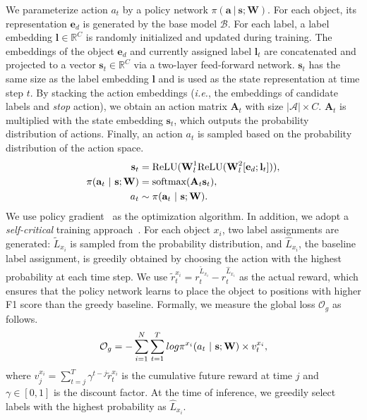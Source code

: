 \documentclass[11pt,a4paper]{article}
\newcommand{\start}[1]{\vspace{1.8mm}\noindent{{\bf #1}}}
\newcommand{\ie}{\textit{i.e.}} \newcommand{\eg}{\textit{e.g.}}
\begin{document}
\start{States and Policy Network.}
We parameterize action $a_t$ by a policy network $\pi(\textbf{a}\ |\ \textbf{s}; \textbf{W})$.
For each object, its representation $\textbf{e}_d$ is generated by the base model $\mathcal{B}$.
For each label, a label embedding $\textbf{l} \in \mathbb{R}^C$ is randomly initialized and updated during training.
The embeddings of the object $\textbf{e}_d$ and currently assigned label $\textbf{l}_t$ are concatenated and projected to a vector $\textbf{s}_t \in \mathbb{R}^{C}$ via a two-layer feed-forward network.
$\textbf{s}_t$ has the same size as the label embedding $\textbf{l}$ and is used as the state representation at time step $t$.
By stacking the action embeddings (\ie, the embeddings of candidate labels and \textit{stop} action), we obtain an action matrix $\textbf{A}_t$ with size $|\mathcal{A}| \times C$.
$\textbf{A}_t$ is multiplied with the state embedding $\textbf{s}_t$, which outputs the probability distribution of actions.
Finally, an action $a_{t}$ is sampled based on the probability distribution of the action space.
\vspace*{-.25cm}
\begin{equation*}
    \begin{split}
    \textbf{s}_t &= \text{ReLU}(\textbf{W}^1_l \text{ReLU}(\textbf{W}^2_l [\textbf{e}_d; \textbf{l}_t])),\\
    \pi(\textbf{a}_t\ |\ \textbf{s}; \textbf{W}) &= \text{softmax}(\textbf{A}_t \textbf{s}_t),\\
    a_t &\sim \pi(\textbf{a}_t\ |\ \textbf{s}; \textbf{W}).
\end{split}
\vspace*{-.25cm}
\end{equation*}
We use policy gradient~\citep{williams1992simple} as the optimization algorithm.
In addition, we adopt a \textit{self-critical} training approach~\citep{rennie2017self}. For each object $x_i$, two label assignments are generated: $\tilde{L}_{x_i}$ is sampled from the probability distribution, and $\hat{L}_{x_i}$, the baseline label assignment, is greedily obtained by choosing the action with the highest probability at each time step.
We use $\tilde{r}_t^{x_i} = r_t^{\tilde{L}_{x_i}} - r_t^{\hat{L}_{x_i}}$ as the actual reward, which ensures that the policy network learns to place the object to positions with higher F1 score than the greedy baseline.
Formally, we measure the global loss $\mathcal{O}_{g}$ as follows.
\vspace*{-.25cm}
\begin{equation*}
    \mathcal{O}_{g} =  -\sum_{i=1}^N \sum_{t=1}^T log \pi^{x_i}(a_t\ |\ \textbf{s}; \textbf{W}) \times v^{x_i}_t,
    \vspace*{-.25cm}
\end{equation*}
where $v^{x_i}_j = \sum_{t=j}^T \gamma^{t-j} \tilde{r}_t^{x_i}$ is the cumulative future reward at time $j$ and $\gamma \in [0, 1]$ is the discount factor.
At the time of inference, we greedily select labels with the highest probability as  $\hat{L}_{x_i}$.  
\end{document}
